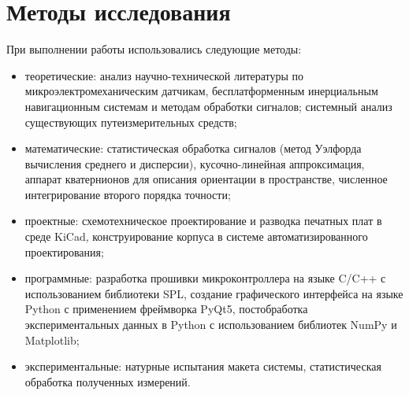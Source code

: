 \section*{Методы исследования}

При выполнении работы использовались следующие методы:
\begin{itemize}
	\item теоретические: анализ научно-технической литературы по микроэлектромеханическим датчикам, бесплатформенным инерциальным навигационным системам и методам обработки сигналов; системный анализ существующих путеизмерительных средств;
	\item математические: статистическая обработка сигналов (метод Уэлфорда вычисления среднего и дисперсии), кусочно-линейная аппроксимация, аппарат кватернионов для описания ориентации в пространстве, численное интегрирование второго порядка точности;
	\item проектные: схемотехническое проектирование и разводка печатных плат в среде KiCad, конструирование корпуса в системе автоматизированного проектирования;
	\item программные: разработка прошивки микроконтроллера на языке C/C++ с использованием библиотеки SPL, создание графического интерфейса на языке Python с применением фреймворка PyQt5, постобработка экспериментальных данных в Python с использованием библиотек NumPy и Matplotlib;
	\item экспериментальные: натурные испытания макета системы, статистическая обработка полученных измерений.
\end{itemize}